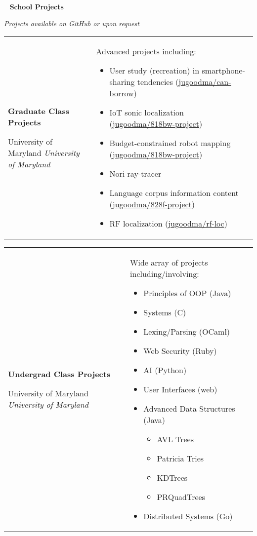 \documentclass[11pt,letterpaper]{article}
\newcommand{\sect}[1]{
\begin{center}
	\noindent\xrfill[0.7ex]{0.5pt} \mbox{ } {\Large \bf #1} \mbox{ } \xrfill[0.7ex]{0.5pt}
\end{center}
}
\newcommand{\entry}[5]{
	\noindent
	\begin{tabular}{p{2in} p{\dimexpr \linewidth-2\tabcolsep-2.25in}} %
		\noindent \textbf{#1}
		
		\ifx #2  \else \noindent \textit{#2} \fi
		
		\ifx #3  \else \noindent \textit{#3} \fi
		
		\ifx #4  \else \noindent #4 \fi
		&
		#5
	\end{tabular}
	\vspace{0.5cm}
}
\begin{document}
	\pagebreak
	\sect{School Projects}
	
	\vspace*{-0.5cm}
	\begin{center}
		{\small \textit{Projects available on GitHub or upon request}}
	\end{center}
	
	\entry{Graduate Class Projects}{University of Maryland}{}{}{
		Advanced projects including:
		\begin{itemize}[nosep, wide]
			\item User study (recreation) in smartphone-sharing tendencies \newline
				\hspace*{1cm} (\href{https://github.com/jugoodma/can-borrow}{jugoodma/can-borrow})
			\item IoT sonic localization (\href{https://github.com/jugoodma/818bw-project}{jugoodma/818bw-project})
			\item Budget-constrained robot mapping (\href{https://github.com/jugoodma/818bw-project}{jugoodma/818bw-project})
			\item Nori ray-tracer 
			\item Language corpus information content (\href{https://github.com/jugoodma/828f-project}{jugoodma/828f-project})
			\item RF localization (\href{https://github.com/jugoodma/rf-loc}{jugoodma/rf-loc})
		\end{itemize}
	}
	
	\entry{Undergrad Class Projects}{University of Maryland}{}{}{
		Wide array of projects including/involving:
		
		\vspace{-1em}
		\begin{multicols}{2}
			\begin{itemize}[nosep, wide]
				\item Principles of OOP (Java)
				\item Systems (C)
				\item Lexing/Parsing (OCaml)
				\item Web Security (Ruby)
				\item AI (Python)
				\item User Interfaces (web)
				\item Advanced Data Structures (Java)
				\begin{itemize}[nosep]
					\item AVL Trees
					\item Patricia Tries
					\item KDTrees
					\item PRQuadTrees
				\end{itemize}
				\item Distributed Systems (Go)
			\end{itemize}
		\end{multicols}
	}
	
\end{document}
